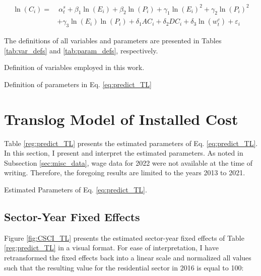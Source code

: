 \documentclass[preprint,12pt,authoryear]{elsarticle}
\begin{document}
\begin{align}
    \ln(C_i) = &~\alpha^{s}_{t} + \beta_1 \ln(E_i) + \beta_2 \ln(P_i) + \gamma_1 \ln(E_i)^2 + \gamma_2 \ln(P_i)^2  \label{eq:predict_TL} \\
		 & + \gamma_3 \ln(E_i) \ln(P_i) + \delta_1 AC_i + \delta_2 DC_i + \delta_3 \ln(w^{c}_{t}) + \varepsilon_i \nonumber
\end{align}

The definitions of all variables and parameters are presented in Tables \ref{tab:var_defs} and \ref{tab:param_defs}, respectively.

\begin{table}
\centering

\caption{Definition of variables employed in this work.}\label{tab:var_defs}
\end{table}

\begin{table}
\centering

\caption{Definition of parameters in Eq. \ref{eq:predict_TL}}\label{tab:param_defs}
\end{table}

\section{Translog Model of Installed Cost}\label{sec:results}

Table \ref{reg:predict_TL} presents the estimated parameters of Eq. \ref{eq:predict_TL}. In this section, I present and interpret the estimated parameters. As noted in Subsection \ref{sec:misc_data}, wage data for 2022 were not available at the time of writing. Therefore, the foregoing results are limited to the years 2013 to 2021.

\begin{table}[p]
\centering

\caption{Estimated Parameters of Eq. \ref{eq:predict_TL}.}\label{reg:predict_TL}
\end{table}

\subsection{Sector-Year Fixed Effects}

Figure \ref{fig:CSCI_TL} presents the estimated sector-year fixed effects of Table \ref{reg:predict_TL} in a visual format. For ease of interpretation, I have retransformed the fixed effects back into a linear scale and normalized all values such that the resulting value for the residential sector in 2016 is equal to 100:
\end{document}
